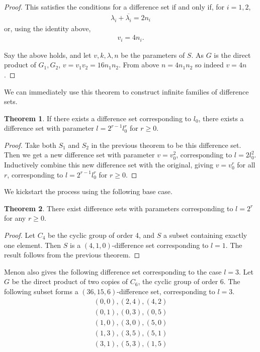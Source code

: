 \documentclass[12pt,a4paper]{article}
\theoremstyle{definition}
\newtheorem{theorem}{Theorem}[section]
\begin{document}
\begin{proof}
This satisfies the conditions for a difference set if and only if, for $i = 1, 2$,
\begin{align*}
\lambda_i + \overline{\lambda_i} = 2 n_i
\end{align*}
or, using the identity above, 
\begin{align*}
v_i = 4 n_i.
\end{align*}

Say the above holds, and let $v, k, \lambda, n$ be the parameters of $S$. As $G$ is the direct product of $G_1, G_2$, $v = v_1 v_2 = 16 n_1 n_2$. From above $n = 4 n_1 n_2$ so indeed $v = 4n$.
\end{proof}

We can immediately use this theorem to construct infinite families of difference sets.

\begin{theorem}
If there exists a difference set corresponding to $l_0$, there exists a difference set with parameter $l = 2^{r-1} l_0^r$ for $r \geq 0$.
\end{theorem}
\begin{proof}
Take both $S_1$ and $S_2$ in the previous theorem to be this difference set. Then we get a new difference set with parameter $v = v_0^2$, corresponding to $l = 2 l_0^2$. Inductively combine this new difference set with the original, giving $v = v_0^r$ for all $r$, corresponding to $l = 2^{r-1} l_0^r$ for $r \geq 0$.
\end{proof}

We kickstart the process using the following base case.

\begin{theorem}
There exist difference sets with parameters corresponding to $l = 2^r$ for any $r \geq 0$.
\end{theorem}
\begin{proof}
Let $C_4$ be the cyclic group of order 4, and $S$ a subset containing exactly one element. Then $S$ is a $(4,1,0)$-difference set corresponding to $l=1$. The result follows from the previous theorem.
\end{proof}

Menon also gives the following difference set corresponding to the case $l=3$. Let $G$ be the direct product of two copies of $C_6$, the cyclic group of order 6. The following subset forms a $(36, 15, 6)$-difference set, corresponding to $l = 3$.
\begin{align*}
(0, 0), (2, 4), (4, 2) \\
(0, 1), (0, 3), (0, 5) \\
(1, 0), (3, 0), (5, 0) \\
(1, 3), (3, 5), (5, 1) \\
(3, 1), (5, 3), (1, 5)
\end{align*}
\end{document}

